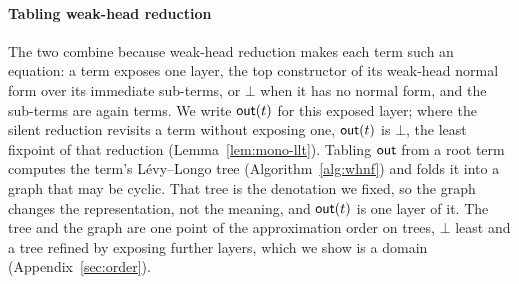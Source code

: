 \paragraph{Tabling weak-head reduction}
The two combine because weak-head reduction makes each term such an equation: a term exposes one layer, the top constructor of its weak-head normal form over its immediate sub-terms, or $\bot$ when it has no normal form, and the sub-terms are again terms. We write $\mathsf{out}(t)$ for this exposed layer; where the silent reduction revisits a term without exposing one, $\mathsf{out}(t)$ is $\bot$, the least fixpoint of that reduction (Lemma~\ref{lem:mono-llt}). Tabling $\mathsf{out}$ from a root term computes the term's L\'evy--Longo tree (Algorithm~\ref{alg:whnf}) and folds it into a graph that may be cyclic. That tree is the denotation we fixed, so the graph changes the representation, not the meaning, and $\mathsf{out}(t)$ is one layer of it. The tree and the graph are one point of the approximation order on trees, $\bot$ least and a tree refined by exposing further layers, which we show is a domain (Appendix~\ref{sec:order}).

